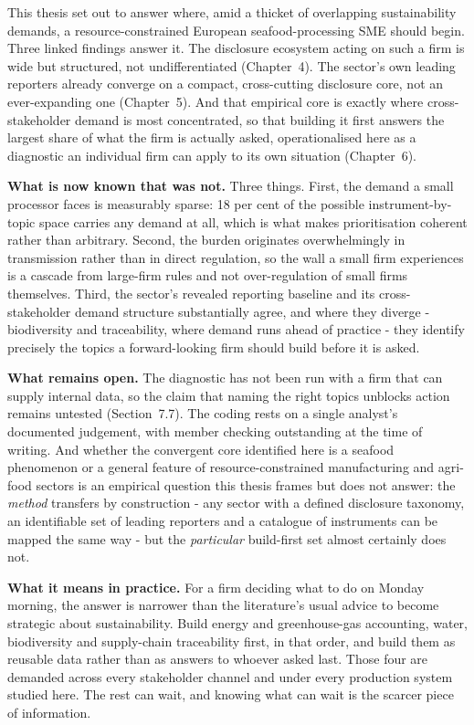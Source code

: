 \documentclass[
]{article}
\begin{document}
This thesis set out to answer where, amid a thicket of overlapping
sustainability demands, a resource-constrained European seafood-processing SME
should begin. Three linked findings answer it. The disclosure ecosystem
acting on such a firm is wide but structured, not undifferentiated
(Chapter~4). The sector's own leading reporters already converge on a
compact, cross-cutting disclosure core, not an ever-expanding one
(Chapter~5). And that empirical core is exactly where cross-stakeholder demand
is most concentrated, so that building it first answers the largest share of
what the firm is actually asked, operationalised here as a diagnostic an
individual firm can apply to its own situation (Chapter~6).

\textbf{What is now known that was not.} Three things. First, the demand a small
processor faces is measurably sparse: 18 per cent of the possible
instrument-by-topic space carries any demand at all, which is what makes
prioritisation coherent rather than arbitrary. Second, the burden originates
overwhelmingly in transmission rather than in direct regulation, so the wall a
small firm experiences is a cascade from large-firm rules and not
over-regulation of small firms themselves. Third, the sector's revealed reporting
baseline and its cross-stakeholder demand structure substantially agree, and where
they diverge - biodiversity and traceability, where demand runs ahead of practice -
they identify precisely the topics a forward-looking firm should build before it
is asked.

\textbf{What remains open.} The diagnostic has not been run with a firm that can
supply internal data, so the claim that naming the right topics unblocks action
remains untested (Section~7.7). The coding rests on a single analyst's documented
judgement, with member checking outstanding at the time of writing. And whether the
convergent core identified here is a seafood phenomenon or a general feature of
resource-constrained manufacturing and agri-food sectors is an empirical question
this thesis frames but does not answer: the \emph{method} transfers by
construction - any sector with a defined disclosure taxonomy, an identifiable set
of leading reporters and a catalogue of instruments can be mapped the same way -
but the \emph{particular} build-first set almost certainly does not.

\textbf{What it means in practice.} For a firm deciding what to do on Monday
morning, the answer is narrower than the literature's usual advice to become
strategic about sustainability. Build energy and greenhouse-gas accounting, water,
biodiversity and supply-chain traceability first, in that order, and build them as
reusable data rather than as answers to whoever asked last. Those four are demanded
across every stakeholder channel and under every production system studied here.
The rest can wait, and knowing what can wait is the scarcer piece of information.
\end{document}
